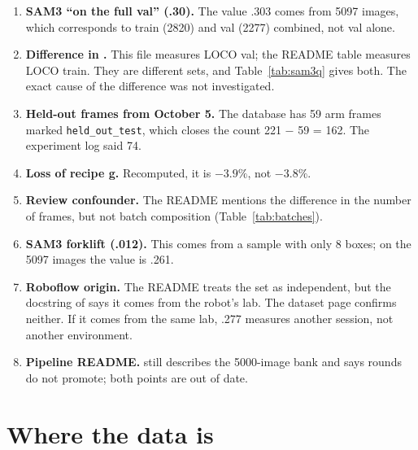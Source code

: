 \documentclass[11pt,a4paper]{article}
\begin{document}
\begin{enumerate}
  \item \textbf{SAM3 ``on the full val'' (.30).} The value .303 comes from 5097
    images, which corresponds to train (2820) and val (2277) combined, not val alone.
  \item \textbf{Difference in .} This file measures LOCO
    val; the README table measures LOCO train. They are different sets, and
    Table~\ref{tab:sam3q} gives both. The exact cause of the difference was not
    investigated.
  \item \textbf{Held-out frames from October 5.} The database has 59 arm frames
    marked \texttt{held\_out\_test}, which closes the count 221 $-$ 59 = 162. The
    experiment log said 74.
  \item \textbf{Loss of recipe g.} Recomputed, it is $-3.9\%$, not $-3.8\%$.
  \item \textbf{Review confounder.} The README mentions the difference in the number
    of frames, but not batch composition (Table~\ref{tab:batches}).
  \item \textbf{SAM3 forklift (.012).} This comes from a sample with only 8 boxes; on
    the 5097 images the value is .261.
  \item \textbf{Roboflow origin.} The README treats the set as independent, but the
    docstring of  says it comes from the robot's lab. The
    dataset page confirms neither. If it comes from the same lab, .277 measures
    another session, not another environment.
  \item \textbf{Pipeline README.}  still describes
    the 5000-image bank and says rounds do not promote; both points are out of date.
\end{enumerate}

\section{Where the data is}
\end{document}
